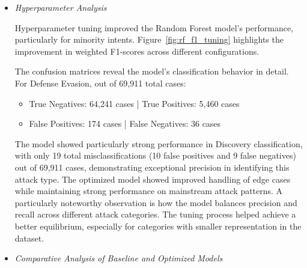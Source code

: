 \begin{itemize}

                \vspace{0.5em}

                \item \textit{Hyperparameter Analysis}
                
                    \vspace{0.3em}
                    

                    Hyperparameter tuning improved the Random Forest model's performance, particularly for minority intents. Figure~\ref{fig:rf_f1_tuning} highlights the improvement in weighted F1-scores across different configurations.
                    
                    
                    The confusion matrices reveal the model's classification behavior in detail. For Defense Evasion, out of 69,911 total cases:
                    
                    \begin{itemize}
                        \item True Negatives: 64,241 cases | True Positives: 5,460 cases
                        \item False Positives: 174 cases | False Negatives: 36 cases 
                    \end{itemize}

                    The model showed particularly strong performance in Discovery classification, with only 19 total misclassifications (10 false positives and 9 false negatives) out of 69,911 cases, demonstrating exceptional precision in identifying this attack type.                     The optimized model showed improved handling of edge cases while maintaining strong performance on mainstream attack patterns. A particularly noteworthy observation is how the model balances precision and recall across different attack categories. The tuning process helped achieve a better equilibrium, especially for categories with smaller representation in the dataset.
            

                \vspace{0.5em}

                \item \textit{Comparative Analysis of Baseline and Optimized Models}
                

\end{itemize}
